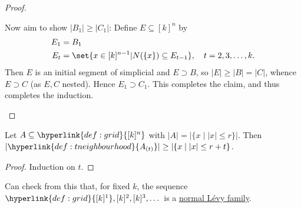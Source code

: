 \documentclass{article}
\let\subset\subseteq
\begin{document}
\begin{proof}
\begin{itemize}
      Now aim to show $|B_1| \geq |C_1|$:
      Define $E \subset [k]^n$ by
      \begin{align*}
        E_1 &= B_1 \\
        E_t &= \set{x \in [k]^{n-1} | N(\{x\}) \subset E_{t-1}}, \quad t=2,3,\dotsc,k.
      \end{align*}
      Then $E$ is an initial segment of simplicial and $E \supset B$, so $|E| \geq |B| = |C|$, whence $E \supset C$ (as $E,C$ nested). Hence $E_1 \supset C_1$.
      This completes the claim, and thus completes the induction. \qedhere
  \end{itemize}
\end{proof}
\begin{ncor}\label{cor:2.11}
  Let $A \subset \hyperlink{def:grid}{[k]^n}$ with $|A| = |\{x \mid |x| \leq r\}|$.
  Then $|\hyperlink{def:tneighbourhood}{A_{(t)}}| \geq |\{x \mid |x| \leq r + t\}$.
\end{ncor}
\begin{proof}
  Induction on $t$.
\end{proof}
\begin{remark}
  Can check from this that, for fixed $k$, the sequence $\hyperlink{def:grid}{[k]^1}, [k]^2, [k]^3, \dotsc$ is a \hyperlink{def:levyfam}{normal L\'evy family}.
\end{remark}
\end{document}
